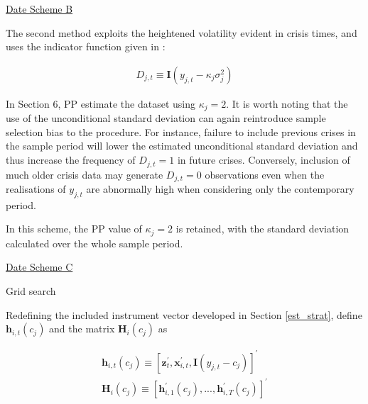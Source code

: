 \documentclass[../base.tex]{subfiles}
\begin{document}
\underline{Date Scheme B}

The second method exploits the heightened volatility evident in crisis times, and uses the indicator function given in \cite{pesaran2007econometric}:

\begin{align}
	D_{j, t} \equiv \mathbf{I}(y_{j,t} - \kappa_j \sigma^2_{j})
\end{align}

In Section 6, PP estimate the \cite{eichengreen1996contagious} dataset using $\kappa_j = 2$. It is worth noting that the use of the unconditional standard deviation can again reintroduce sample selection bias to the procedure. For instance, failure to include previous crises in the sample period will lower the estimated unconditional standard deviation and thus increase the frequency of $D_{j,t} = 1$ in future crises. Conversely, inclusion of much older crisis data may generate $D_{j,t} = 0$ observations even when the realisations of $y_{j,t}$ are abnormally high when considering only the contemporary period. 

In this scheme, the PP value of $\kappa_j = 2$ is retained, with the standard deviation calculated over the whole sample period.

\underline{Date Scheme C}

Grid search

Redefining the included instrument vector developed in Section \ref{est_strat}, define $\mathbf{h}_{i,t}(c_j)$ and the matrix $\mathbf{H}_{i}(c_j)$ as

\begin{align}
	\mathbf{h}_{i,t}(c_j) \equiv [\mathbf{z}_{t}^{\prime}, \mathbf{x}_{i,t}^{\prime}, \mathbf{I}(y_{j,t} - c_j)]^\prime \\
	\mathbf{H}_i(c_j) \equiv [\mathbf{h}_{i,1}^{\prime}(c_j), ... , \mathbf{h}_{i,T}^{\prime}(c_j)]^{\prime}
\end{align}




\end{document}
